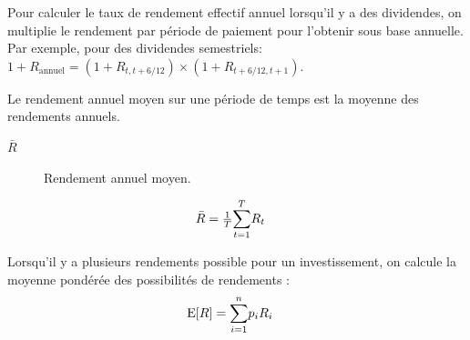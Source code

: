 \documentclass[10pt, french]{article}
\begin{document}
\begin{multicols*}{2}
\begin{definitionNOHFILL}
\begin{definitionNOHFILLsub}
Pour calculer le taux de rendement effectif annuel lorsqu'il y a des dividendes, on multiplie le rendement par période de paiement pour l'obtenir sous base annuelle.	\\

Par exemple, pour des dividendes semestriels: $1 + R_{\text{annuel}}	=	(1 + R_{t, t + 6/12}) \times (1 + R_{t + 6/12, t + 1})$.
\end{definitionNOHFILLsub}

\begin{definitionNOHFILLsub}
Le rendement annuel moyen sur une période de temps est la moyenne des rendements annuels.

\begin{distributions}[Notation]
\begin{description}
	\item[$\bar{R}$]	Rendement annuel moyen.
\end{description}
\end{distributions}

\begin{align*}
	\bar{R}
	&=	\tfrac{1}{T} \overset{T}{\underset{t	=	1}{\sum}}R_{t}
\end{align*}
\end{definitionNOHFILLsub}
\end{definitionNOHFILL}

\begin{definitionNOHFILL}
Lorsqu'il y a plusieurs rendements possible pour un investissement, on calcule la moyenne pondérée des possibilités de rendements : 
\begin{align*}
	\text{E}[R]
	&=	\overset{n}{\underset{i	=	1}{\sum}} p_{i}R_{i}
\end{align*}
\end{definitionNOHFILL}


\end{multicols*}
\end{document}
